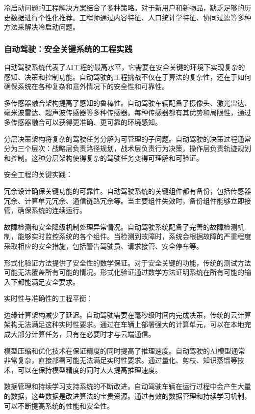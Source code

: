 冷启动问题的工程解决方案结合了多种策略。对于新用户和新物品，缺乏足够的历史数据进行个性化推荐。工程师通过内容特征、人口统计学特征、协同过滤等多种方法来解决冷启动问题。

\subsubsection{自动驾驶：安全关键系统的工程实践}

自动驾驶系统代表了AI工程的最高水平，它需要在安全关键的环境下实现复杂的感知、决策和控制功能。自动驾驶的工程挑战不仅在于算法的复杂性，还在于如何确保系统在各种复杂和意外情况下的安全性和可靠性。

多传感器融合架构提高了感知的鲁棒性。自动驾驶车辆配备了摄像头、激光雷达、毫米波雷达、超声波传感器等多种传感器。每种传感器都有其优势和局限性，通过多传感器融合可以获得更准确、更可靠的环境感知。

分层决策架构将复杂的驾驶任务分解为可管理的子问题。自动驾驶的决策过程通常分为三个层次：战略层负责路径规划，战术层负责行为决策，操作层负责轨迹规划和控制。这种分层架构使得复杂的驾驶任务变得可理解和可验证。

安全工程的关键实践：

冗余设计确保关键功能的可靠性。自动驾驶系统的关键组件都有备份，包括传感器冗余、计算单元冗余、通信链路冗余等。当主要组件失效时，备份组件能够立即接管，确保系统的连续运行。

故障检测和安全降级机制处理异常情况。自动驾驶系统配备了完善的故障检测机制，能够实时监控系统的各个组件。当检测到故障时，系统会根据故障的严重程度采取相应的安全措施，包括警告驾驶员、请求接管、安全停车等。

形式化验证方法提供了安全性的数学保证。对于安全关键的功能，传统的测试方法可能无法覆盖所有可能的情况。形式化验证通过数学方法证明系统在所有可能的输入下都能满足安全要求。

实时性与准确性的工程平衡：

边缘计算架构减少了延迟。自动驾驶需要在毫秒级时间内完成决策，传统的云计算架构无法满足这种实时性要求。通过在车辆上部署强大的计算单元，可以在本地完成大部分计算任务，只有在必要时才与云端通信。

模型压缩和优化技术在保证精度的同时提高了推理速度。自动驾驶的AI模型通常非常复杂，直接部署可能无法满足实时性要求。通过量化、剪枝、知识蒸馏等技术，可以在保持模型精度的同时大大提高推理速度。

数据管理和持续学习支持系统的不断改进。自动驾驶车辆在运行过程中会产生大量的数据，这些数据是改进算法的宝贵资源。通过有效的数据管理和持续学习机制，可以不断提高系统的性能和安全性。

